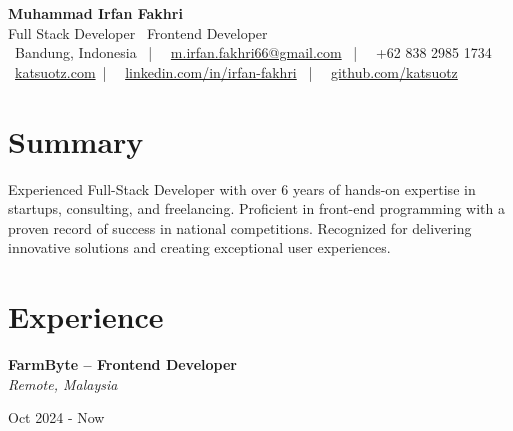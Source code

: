 \documentclass[10pt, letterpaper]{article}
\newenvironment{twocolentry}[2][]{
    \onecolentry
    \def\secondColumn{#2}
    \setcolumnwidth{\fill, 4.5 cm}
    \begin{paracol}{2}
}{
    \switchcolumn \raggedleft \secondColumn
    \end{paracol}
    \endonecolentry
} %
\newenvironment{header}{
    \setlength{\topsep}{0pt}\par\kern\topsep\centering\linespread{1.5}
}{
    \par\kern\topsep
} %
\begin{document}
    \newcommand{\AND}{\unskip
        \cleaders\copy\ANDbox\hskip\wd\ANDbox
        \ignorespaces
    }
    \newsavebox\ANDbox
    \sbox\ANDbox{$|$}

    \begin{header}
        \fontsize{28pt}{30pt}\selectfont\textbf{Muhammad Irfan Fakhri}\\
        \fontsize{12pt}{14pt}\selectfont Full Stack Developer \textbullet\ Frontend Developer\\
        \small
        \faMapMarker \, Bandung, Indonesia \, | \,
        \faEnvelope \, \href{mailto:m.irfan.fakhri66@gmail.com}{m.irfan.fakhri66@gmail.com} \, | \,
        \faPhone \, +62 838 2985 1734 \\
        \faGlobe \, \href{https://katsuotz.com/}{katsuotz.com}\ | \,
        \faLinkedin \, \href{https://linkedin.com/in/irfan-fakhri}{linkedin.com/in/irfan-fakhri} \, | \,
        \faGithub \, \href{https://github.com/katsuotz}{github.com/katsuotz}
    \end{header}

    \vspace{5 pt - 0.3 cm}


    \section{Summary}
    Experienced Full-Stack Developer with over 6 years of hands-on expertise in startups, consulting, and freelancing. Proficient in front-end programming with a proven record of success in national competitions. Recognized for delivering innovative solutions and creating exceptional user experiences.


        \vspace{0.2 cm}
    
    \section{Experience}


        \begin{twocolentry}{
            Oct 2024 - Now
        }
             \textbf{FarmByte -- Frontend Developer} \\
             \textit{Remote, Malaysia}
            \end{twocolentry}
\end{document}
